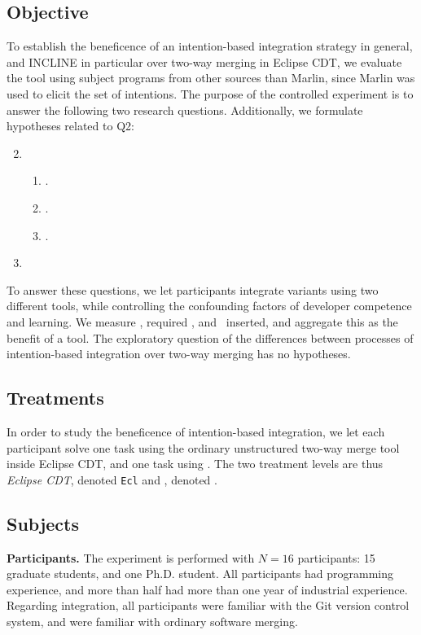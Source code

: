 \subsection{Objective}
To establish the beneficence of an intention-based integration strategy in general, and INCLINE in particular over two-way merging in Eclipse CDT, we evaluate the tool using subject programs from other sources than Marlin, since Marlin was used to elicit the set of intentions. The purpose of the controlled experiment is to answer the following two research questions. Additionally, we formulate hypotheses related to Q2:

\begin{enumerate}[label={Q\arabic*}]
    \setcounter{enumi}{1}
    \item \RQB
    \begin{enumerate}[label={H\arabic*}]
        \item \HA.
        \item \HB.
        \item \HC.
    \end{enumerate}
    \item \RQC
\end{enumerate}

To answer these questions, we let participants integrate variants using two different tools, while controlling the confounding factors of developer competence and learning. We measure \ctime, required \eops, and ~inserted, and aggregate this as the benefit of a tool. The exploratory question of the differences between processes of intention-based integration over two-way merging has no hypotheses.

\subsection{Treatments}
In order to study the beneficence of intention-based integration, we let each participant solve one task using the ordinary unstructured two-way merge tool inside Eclipse CDT, and one task using \tooln. The two treatment levels are thus \textit{Eclipse CDT}, denoted \texttt{Ecl} and \textit{\tooln}, denoted \inc.

\subsection{Subjects}
\textbf{Participants.}
The experiment is performed with $N=16$ participants: 15 graduate students, and one Ph.D. student. All participants had programming experience, and more than half had more than one year of industrial experience. Regarding integration, all participants were familiar with the Git version control system, and were familiar with ordinary software merging.


